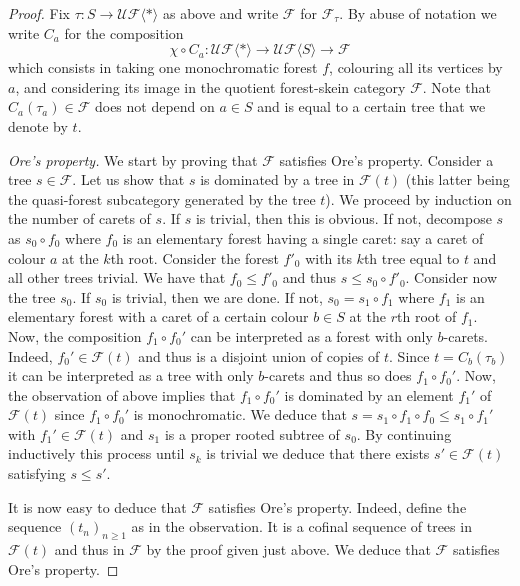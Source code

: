\documentclass[a4paper, 12pt]{amsart}
\numberwithin{equation}{section}
\theoremstyle{definition}
\newcommand{\cF}{\mathcal F}
\newcommand{\la}{\langle}
\newcommand{\ra}{\rangle}
\newcommand{\cUF}{\mathcal{UF}}
\begin{document}
\begin{proof}
Fix $\tau:S\to\cUF\la*\ra$ as above and write $\cF$ for $\cF_\tau$.
By abuse of notation we write $C_a$ for the composition 
$$\chi\circ C_a:\cUF\la*\ra\to\cUF\la S\ra\to\cF$$ 
which consists in taking one monochromatic forest $f$, colouring all its vertices by $a$, and considering its image in the quotient forest-skein category $\cF$. 
Note that $C_a(\tau_a)\in\cF$ does not depend on $a\in S$ and is equal to a certain tree that we denote by $t$.

{\it Ore's property.}
We start by proving that $\cF$ satisfies Ore's property.
Consider a tree $s\in\cF$. Let us show that $s$ is dominated by a tree in $\cF(t)$ (this latter being the quasi-forest subcategory generated by the tree $t$).
We proceed by induction on the number of carets of $s$.
If $s$ is trivial, then this is obvious. 
If not, decompose $s$ as $s_0\circ f_0$ where $f_0$ is an elementary forest having a single caret: say a caret of colour $a$ at the $k$th root.
Consider the forest $f'_0$ with its $k$th tree equal to $t$ and all other trees trivial.
We have that $f_0\leq f'_0$ and thus $s\leq s_0\circ f'_0$.
Consider now the tree $s_0$. If $s_0$ is trivial, then we are done.
If not, $s_0 = s_1\circ f_1$ where $f_1$ is an elementary forest with a caret of a certain colour $b\in S$ at the $r$th root of $f_1.$
Now, the composition $f_1\circ f_0'$ can be interpreted as a forest with only $b$-carets. 
Indeed, $f_0'\in\cF(t)$ and thus is a disjoint union of copies of $t$. 
Since $t=C_b(\tau_b)$ it can be interpreted as a tree with only $b$-carets and thus so does $f_1\circ f_0'$.
Now, the observation of above implies that $f_1\circ f_0'$ is dominated by an element $f_1'$ of $\cF(t)$ since $f_1\circ f_0'$ is monochromatic.
We deduce that $s=s_1\circ f_1\circ f_0\leq s_1\circ f_1'$ with $f_1'\in\cF(t)$ and $s_1$ is a proper rooted subtree of $s_0$.
By continuing inductively this process until $s_k$ is trivial we deduce that there exists $s'\in\cF(t)$ satisfying $s\leq s'$.

It is now easy to deduce that $\cF$ satisfies Ore's property.
Indeed, define the sequence $(t_n)_{n\geq 1}$ as in the observation. It is a cofinal sequence of trees in $\cF(t)$ and thus in $\cF$ by the proof given just above. We deduce that $\cF$ satisfies Ore's property.


\end{proof}
\end{document}
